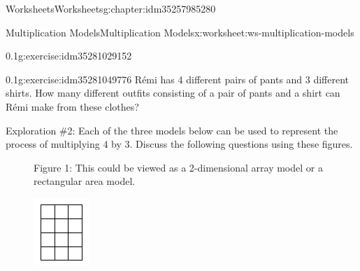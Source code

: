 \documentclass[twoside,11pt,]{book}
\begin{document}
\begin{chapterptx}{Worksheets}{}{Worksheets}{}{}{g:chapter:idm35257985280}
\begin{worksheet-section-numberless}{Multiplication Models}{}{Multiplication Models}{}{}{x:worksheet:ws-multiplication-models}
\begin{divisionexercise}{3}{}{0.1}{g:exercise:idm35281029152}
\end{divisionexercise}%
\begin{divisionexercise}{4}{}{0.1}{g:exercise:idm35281049776}%
Rémi has 4 different pairs of pants and 3 different shirts. How many different outfits consisting of a pair of pants and a shirt can Rémi make from these clothes?%
\end{divisionexercise}%
\clearpage
\begin{introduction}{}%
Exploration \#2: Each of the three models below can be used to represent the process of multiplying 4 by 3.  Discuss the following questions using these figures.%
%
\begin{description}
\item[{}]Figure 1: This could be viewed as a 2-dimensional array model or a rectangular area model. \begin{sidebyside}{1}{0.45}{0.45}{0}%
\begin{sbspanel}{0.1}%
\includegraphics[width=1\linewidth]{images/mult-array.png}
\end{sbspanel}%
\end{sidebyside}%

\end{description}
\end{introduction}
\end{worksheet-section-numberless}
\end{chapterptx}
\end{document}
